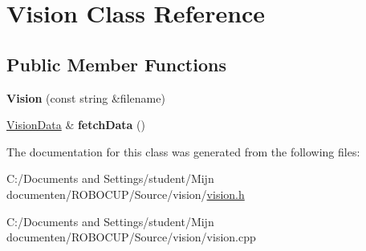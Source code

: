\hypertarget{class_vision}{\section{Vision Class Reference}
\label{class_vision}
}
\subsection*{Public Member Functions}
\begin{DoxyCompactItemize}
\item 
\hypertarget{class_vision_afc3b9a22c1c11cd10f28ebd0e06b5e28}{{\bfseries Vision} (const string \&filename)}\label{class_vision_afc3b9a22c1c11cd10f28ebd0e06b5e28}

\item 
\hypertarget{class_vision_ade95aa586489ec1f21ea9c383a82edf4}{\hyperlink{class_vision_data}{Vision\-Data} \& {\bfseries fetch\-Data} ()}\label{class_vision_ade95aa586489ec1f21ea9c383a82edf4}

\end{DoxyCompactItemize}


The documentation for this class was generated from the following files\-:\begin{DoxyCompactItemize}
\item 
C\-:/\-Documents and Settings/student/\-Mijn documenten/\-R\-O\-B\-O\-C\-U\-P/\-Source/vision/\hyperlink{vision_8h}{vision.\-h}\item 
C\-:/\-Documents and Settings/student/\-Mijn documenten/\-R\-O\-B\-O\-C\-U\-P/\-Source/vision/vision.\-cpp\end{DoxyCompactItemize}
